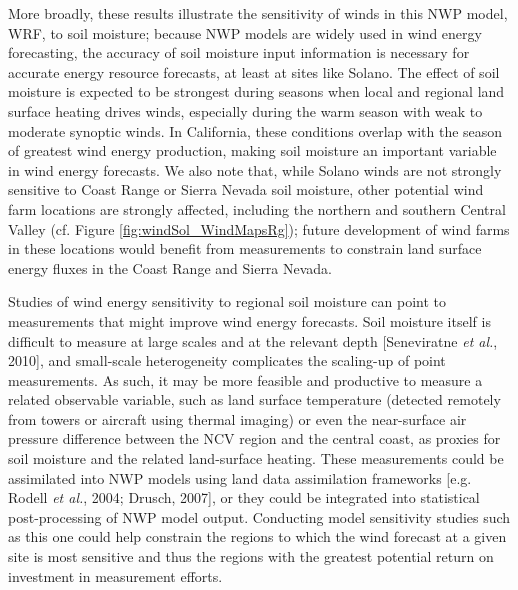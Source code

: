 More broadly, these results illustrate the sensitivity of winds in this NWP model, WRF, to soil moisture; because NWP models are widely used in wind energy forecasting, the accuracy of soil moisture input information is necessary for accurate energy resource forecasts, at least at sites like Solano.  The effect of soil moisture is expected to be strongest during seasons when local and regional land surface heating drives winds, especially during the warm season with weak to moderate synoptic winds.  In California, these conditions overlap with the season of greatest wind energy production, making soil moisture an important variable in wind energy forecasts.  We also note that, while Solano winds are not strongly sensitive to Coast Range or Sierra Nevada soil moisture, other potential wind farm locations are strongly affected, including the northern and southern Central Valley (cf. Figure \ref{fig:windSol_WindMapsRg}); future development of wind farms in these locations would benefit from measurements to constrain land surface energy fluxes in the Coast Range and Sierra Nevada.

Studies of wind energy sensitivity to regional soil moisture can point to measurements that might improve wind energy forecasts.  Soil moisture itself is difficult to measure at large scales and at the relevant depth [Seneviratne \textit{et al.}, 2010], and small-scale heterogeneity complicates the scaling-up of point measurements.  As such, it may be more feasible and productive to measure a related observable variable, such as land surface temperature (detected remotely from towers or aircraft using thermal imaging) or even the near-surface air pressure difference between the NCV region and the central coast, as proxies for soil moisture and the related land-surface heating.  These measurements could be assimilated into NWP models using land data assimilation frameworks [e.g. Rodell \textit{et al.}, 2004; Drusch, 2007], or they could be integrated into statistical post-processing of NWP model output.  Conducting model sensitivity studies such as this one could help constrain the regions to which the wind forecast at a given site is most sensitive and thus the regions with the greatest potential return on investment in measurement efforts.

